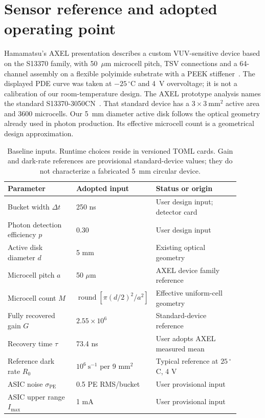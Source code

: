 \documentclass[11pt]{article}
\newcommand{\PE}{\mathrm{PE}}
\begin{document}
\section{Sensor reference and adopted operating point}
Hamamatsu's AXEL presentation describes a custom VUV-sensitive device based on
the S13370 family, with 50~$\mu$m microcell pitch, TSV connections and a
64-channel assembly on a flexible polyimide substrate with a PEEK
stiffener~\cite{Ghassemi2024MPPC}. The displayed PDE curve was taken at
$-25\,^{\circ}\mathrm{C}$ and 4~V overvoltage; it is not a calibration of our
room-temperature design. The AXEL prototype analysis names the standard
S13370-3050CN~\cite{Akiyama:2025dia}. That standard device has a
$3\times3~\mathrm{mm^2}$ active area and 3600 microcells. Our 5~mm diameter
active disk follows the optical geometry already used in photon production.
Its effective microcell count is a geometrical design approximation.

\begin{table}[htbp]
\centering\small
\begin{tabular}{p{0.30\linewidth}p{0.23\linewidth}p{0.37\linewidth}}
\toprule
Parameter & Adopted input & Status or origin\\
\midrule
Bucket width $\Delta t$ & 250 ns & User design input; detector card\\
Photon detection efficiency $p$ & 0.30 & User design input\\
Active disk diameter $d$ & 5 mm & Existing optical geometry\\
Microcell pitch $a$ & 50 $\mu$m & AXEL device family reference\\
Microcell count $M$ & $\operatorname{round}[\pi(d/2)^2/a^2]$ & Effective uniform-cell geometry\\
Fully recovered gain $G$ & $2.55\times10^6$ & Standard-device reference\\
Recovery time $\tau$ & 73.4 ns & User adopts AXEL measured mean\\
Reference dark rate $R_0$ & $10^6~\mathrm{s^{-1}}$ per 9 mm$^2$ & Typical reference at $25\,^{\circ}$C, 4 V\\
ASIC noise $\sigma_{\PE}$ & 0.5 PE RMS/bucket & User provisional input\\
ASIC upper range $I_{\max}$ & 1 mA & User provisional input\\
\bottomrule
\end{tabular}
\caption{Baseline inputs. Runtime choices reside in versioned TOML cards.
Gain and dark-rate references are provisional standard-device values;
they do not characterize a fabricated 5~mm circular device.}
\label{tab:inputs}
\end{table}
\end{document}

